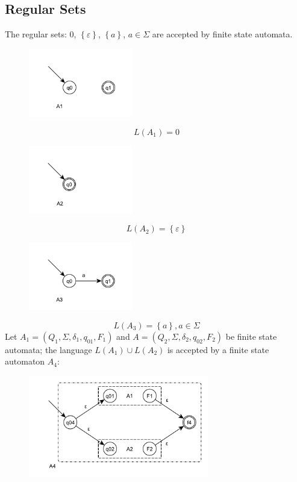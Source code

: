 \subsection{Regular Sets}
The regular sets: $0$, $\left\{\varepsilon\right\}$, $\left\{a\right\}$, $a \in \Sigma$ are accepted by finite state automata.
\begin{figure}[H]
	\centerline{\includegraphics[width=0.4\textwidth]{img/4.pdf}}
\end{figure}
$$
	L(A_1) = 0
$$
\begin{figure}[H]
	\centerline{\includegraphics[width=0.4\textwidth]{img/5.pdf}}
\end{figure}
$$
	L(A_2) = \left\{\varepsilon\right\}
$$
\begin{figure}[H]
	\centerline{\includegraphics[width=0.4\textwidth]{img/6.pdf}}
\end{figure}
$$
	L(A_3) = \left\{a\right\}, a \in \Sigma
$$
Let $A_1 = (Q_1, \Sigma, \delta_1, q_{01}, F_1)$ and $A = (Q_2, \Sigma, \delta_2, q_{02}, F_2)$ be finite state automata; the language $L(A_1) \cup L(A_2)$ is accepted by a finite state automaton $A_4$:
\begin{figure}[H]
	\centerline{\includegraphics[width=0.7\textwidth]{img/7.pdf}}
\end{figure}

